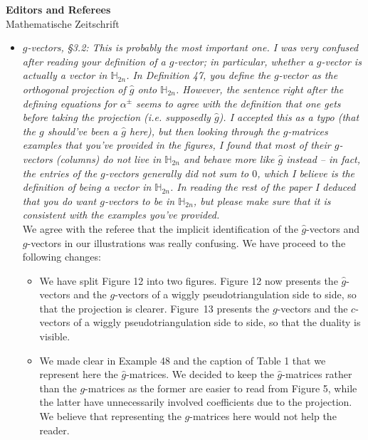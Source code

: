 \documentclass{letter}
\begin{document}
\begin{letter}{{\bf Editors and Referees} \\ Mathematische Zeitschrift}
\begin{itemize}
\item \textsl{\color{gray} $g$-vectors, §3.2: This is probably the most important one. I was very confused after reading your definition of a $g$-vector; in particular, whether a $g$-vector is actually a vector in $\mathbb{H}_{2n}$. In Definition 47, you define the $g$-vector as the orthogonal projection of $\hat{g}$ onto $\mathbb{H}_{2n}$. However, the sentence right after the defining equations for $\alpha^\pm$ seems to agree with the definition that one gets before taking the projection (i.e. supposedly $\hat{g}$). I accepted this as a typo (that the $g$ should’ve been a $\hat{g}$ here), but then looking through the $g$-matrices examples that you’ve provided in the figures, I found that most of their $g$-vectors (columns) do not live in $\mathbb{H}_{2n}$ and behave more like $\hat{g}$ instead – in fact, the entries of the $g$-vectors generally did not sum to $0$, which I believe is the definition of being a vector in $\mathbb{H}_{2n}$. In reading the rest of the paper I deduced that you do want $g$-vectors to be in $\mathbb{H}_{2n}$, but please make sure that it is consistent with the examples you’ve provided.} \\
We agree with the referee that the implicit identification of the $\hat{g}$-vectors and $g$-vectors in our illustrations was really confusing. We have proceed to the following changes:
\begin{itemize}
\item We have split Figure 12 into two figures. Figure 12 now presents the $\hat{g}$-vectors and the \mbox{$g$-vectors} of a wiggly pseudotriangulation side to side, so that the projection is clearer. Figure~13 presents the $g$-vectors and the $c$-vectors of a wiggly pseudotriangulation side to side, so that the duality is visible.
\item We made clear in Example 48 and the caption of Table 1 that we represent here the $\hat{g}$-matrices. We decided to keep the $\hat{g}$-matrices rather than the $g$-matrices as the former are easier to read from Figure 5, while the latter have unnecessarily involved coefficients due to the projection. We believe that representing the $g$-matrices here would not help the reader.
\end{itemize}


\end{itemize}
\end{letter}
\end{document}
